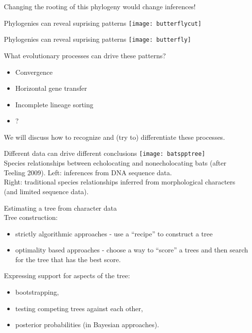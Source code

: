 \documentclass{beamer}
\begin{document}



\begin{frame}
Changing the rooting of this phylogeny would change inferences!
\end{frame}


\begin{frame}
Phylogenies can reveal suprising patterns
 \texttt{[image: butterflycut]}
\end{frame}

\begin{frame}
Phylogenies can reveal suprising patterns
 \texttt{[image: butterfly]}
 \citep{joron_chromosomal_2011}
\end{frame}



\begin{frame}
What evolutionary processes can drive these patterns?
\begin{itemize}
 \item Convergence
 \item Horizontal gene transfer
 \item Incomplete lineage sorting
 \item ?
\end{itemize}
\pause
We will discuss how to recognize and (try to) differentiate these processes.
\end{frame}

\begin{frame}
Different data can drive different conclusions
 \texttt{[image: batspptree]}\\
Species relationships between echolocating and nonecholocating bats (after Teeling 2009).
Left: inferences from DNA sequence data.\\
Right: traditional species relationships inferred from morphological characters (and limited sequence data).
\citep{hahn_irrational_2016}
\end{frame}



\begin{frame}
Estimating a tree from character data\\
Tree construction:
\begin{itemize}
 \item strictly algorithmic approaches - use a “recipe” to construct a tree
  \item optimality based approaches - choose a way to “score” a trees and then search for the tree that has the best score.
\end{itemize}

Expressing support for aspects of the tree:
\begin{itemize}
 \item  bootstrapping,
 \item testing competing trees against each other,
 \item posterior probabilities (in Bayesian approaches).
\end{itemize}
\end{frame}


\appendix
\begin{frame}[allowframebreaks]
 
\end{frame}
\end{document}

